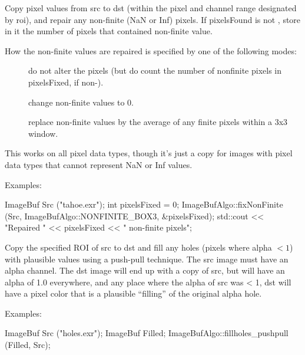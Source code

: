 Copy pixel values from {\cf src} to {\cf dst} (within the pixel and channel
range designated by {\cf roi}), and repair any non-finite ({\cf NaN} or {\cf
Inf}) pixels.  If {\cf pixelsFound} is not \NULL, store in it the number of
pixels that contained non-finite value.

How the non-finite values are repaired is specified by one of the
following modes:

\begin{description} 
\item[\spc] \spc
\item[\rm {}]   do not alter the pixels (but do count the number
                       of nonfinite pixels in {\cf *pixelsFixed}, if non-\NULL).
\item[\rm {}]  change non-finite values to 0.
\item[\rm {}]   replace non-finite values by the average of any
                     finite pixels within a 3x3 window.
\end{description}

This works on all pixel data types, though it's just a copy for images with
pixel data types that cannot represent {\cf NaN} or {\cf Inf} values.


\smallskip
\noindent Examples:
\begin{code}
    ImageBuf Src ("tahoe.exr");
    int pixelsFixed = 0;
    ImageBufAlgo::fixNonFinite (Src, ImageBufAlgo::NONFINITE_BOX3,
                                &pixelsFixed);
    std::cout << "Repaired " << pixelsFixed << " non-finite pixels\n";
\end{code}
\apiend


 
Copy the specified ROI of {\cf src} to {\cf dst} and fill any 
holes (pixels where alpha $< 1$) with plausible values using a push-pull
technique.  The {\cf src} image must have
an alpha channel.  The dst image will end up with a copy of src, but
will have an alpha of 1.0 everywhere, and any place where the alpha
of src was < 1, dst will have a pixel color that is a plausible
``filling'' of the original alpha hole.

\smallskip
\noindent Examples:
\begin{code}
    ImageBuf Src ("holes.exr");
    ImageBuf Filled;
    ImageBufAlgo::fillholes_pushpull (Filled, Src);
\end{code}
\apiend


